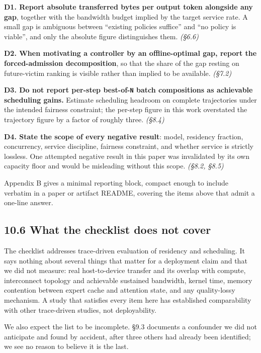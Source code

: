 \documentclass[
  10pt,
  letterpaper,
  10pt]{article}
\begin{document}
\textbf{D1. Report absolute transferred bytes per output token alongside
any gap}, together with the bandwidth budget implied by the target
service rate. A small gap is ambiguous between ``existing policies
suffice'' and ``no policy is viable'', and only the absolute figure
distinguishes them. \emph{(§6.6)}

\textbf{D2. When motivating a controller by an offline-optimal gap,
report the forced-admission decomposition}, so that the share of the gap
resting on future-victim ranking is visible rather than implied to be
available. \emph{(§7.2)}

\textbf{D3. Do not report per-step best-of-\texttt{N} batch compositions
as achievable scheduling gains.} Estimate scheduling headroom on
complete trajectories under the intended fairness constraint; the
per-step figure in this work overstated the trajectory figure by a
factor of roughly three. \emph{(§8.4)}

\textbf{D4. State the scope of every negative result}: model, residency
fraction, concurrency, service discipline, fairness constraint, and
whether service is strictly lossless. One attempted negative result in
this paper was invalidated by its own capacity floor and would be
misleading without this scope. \emph{(§8.2, §8.5)}

Appendix B gives a minimal reporting block, compact enough to include
verbatim in a paper or artifact README, covering the items above that
admit a one-line answer.

\subsection{10.6 What the checklist does not
cover}\label{what-the-checklist-does-not-cover}

The checklist addresses trace-driven evaluation of residency and
scheduling. It says nothing about several things that matter for a
deployment claim and that we did not measure: real host-to-device
transfer and its overlap with compute, interconnect topology and
achievable sustained bandwidth, kernel time, memory contention between
expert cache and attention state, and any quality-lossy mechanism. A
study that satisfies every item here has established comparability with
other trace-driven studies, not deployability.

We also expect the list to be incomplete. §9.3 documents a confounder we
did not anticipate and found by accident, after three others had already
been identified; we see no reason to believe it is the last.
\end{document}
